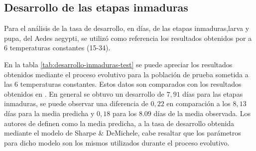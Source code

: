 
\subsection{Desarrollo de las etapas inmaduras}
Para el análisis de la tasa de desarrollo, en días, de las etapas inmaduras,larva y pupa, del Aedes
aegypti, se utilizó como referencia los resultados obtenidos por \cite{rueda1990temperature} a 6
temperaturas constantes (15-34\textcelsius).

En la tabla \ref{tab:desarrollo-inmaduras-test} se puede apreciar los resultados obtenidos mediante el
proceso evolutivo para la población de prueba sometida a las 6 temperaturas constantes. Estos datos son
comparados con los resultados obtenidos en \cite{rueda1990temperature}. En general se obtuvo un 
desarrollo de $7,91$ días para las etapas inmaduras, se puede observar una diferencia de $0,22$ en
comparación a los $8,13$ días para la media predicha y $0,18$ para los $8.09$ días de la media observada. Los
autores de \cite{rueda1990temperature} definen como la media predicha, a la tasa de desarrollo obtenida
mediante el modelo de Sharpe \& DeMichele, cabe resaltar que los parámetros para dicho modelo son los
mismos utilizados durante el proceso evolutivo.

